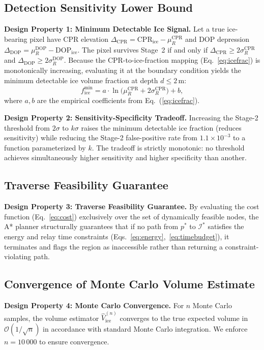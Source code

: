 \documentclass[10pt,conference]{IEEEtran}
\newcommand{\CPR}{\mathrm{CPR}}
\newcommand{\DOP}{\mathrm{DOP}}
\newcommand{\Fice}{f_{\mathrm{ice}}}
\newcommand{\bigO}[1]{\mathcal{O}\!\left(#1\right)}
\begin{document}
\subsection{Detection Sensitivity Lower Bound}

\textbf{Design Property 1: Minimum Detectable Ice Signal.}
Let a true ice-bearing pixel have CPR elevation $\Delta_{\CPR} = \CPR_{\mathrm{ice}} - \mu_R^{\CPR}$ and DOP depression $\Delta_{\DOP} = \mu_R^{\DOP} - \DOP_{\mathrm{ice}}$. The pixel survives Stage~2 if and only if $\Delta_{\CPR} \ge 2\sigma_R^{\CPR}$ and $\Delta_{\DOP} \ge 2\sigma_R^{\DOP}$. Because the CPR-to-ice-fraction mapping (Eq.~\ref{eq:icefrac}) is monotonically increasing, evaluating it at the boundary condition yields the minimum detectable ice volume fraction at depth $d \le 2$\,m:
\begin{equation}
\Fice^{\min} = a \cdot \ln\!\bigl(\mu_R^{\CPR} + 2\sigma_R^{\CPR}\bigr) + b,
\label{eq:ficemin}
\end{equation}
where $a, b$ are the empirical coefficients from Eq.~(\ref{eq:icefrac}).

\textbf{Design Property 2: Sensitivity-Specificity Tradeoff.}
Increasing the Stage-2 threshold from $2\sigma$ to $k\sigma$ raises the minimum detectable ice fraction (reduces sensitivity) while reducing the Stage-2 false-positive rate from $1.1 \times 10^{-3}$ to a function parameterized by $k$. The tradeoff is strictly monotonic: no threshold achieves simultaneously higher sensitivity and higher specificity than another.

\subsection{Traverse Feasibility Guarantee}

\textbf{Design Property 3: Traverse Feasibility Guarantee.}
By evaluating the cost function (Eq.~\ref{eq:cost}) exclusively over the set of dynamically feasible nodes, the A* planner structurally guarantees that if no path from $p^*$ to $\mathcal{I}^*$ satisfies the energy and relay time constraints (Eqs.~\ref{eq:energy},~\ref{eq:timebudget}), it terminates and flags the region as inaccessible rather than returning a constraint-violating path.

\subsection{Convergence of Monte Carlo Volume Estimate}

\textbf{Design Property 4: Monte Carlo Convergence.}
For $n$ Monte Carlo samples, the volume estimator $\hat{V}_{\mathrm{ice}}^{(n)}$ converges to the true expected volume in $\bigO{1/\sqrt{n}}$ in accordance with standard Monte Carlo integration. We enforce $n = 10\,000$ to ensure convergence.
\end{document}
